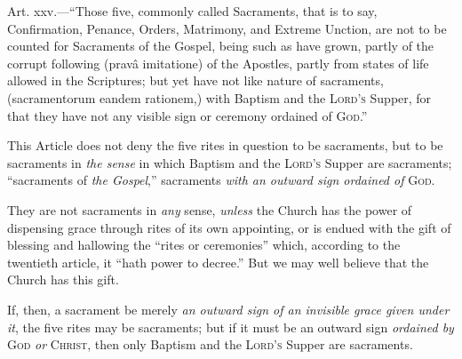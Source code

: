 
Art. xxv.—``Those five, commonly called Sacraments, that is
to say, Confirmation, Penance, Orders, Matrimony, and Extreme Unction,
are not to be counted for Sacraments of the Gospel, being such as have
grown, partly of the corrupt following (pravâ imitatione) of the
Apostles, partly from states of life allowed in the Scriptures; but
yet have not like nature of sacraments, (sacramentorum eandem rationem,)
with Baptism and the L\textsc{ord's} Supper, for that
they have not any visible sign or ceremony ordained of G\textsc{od}.''

This Article does not deny the five rites in question to be
sacraments, but to be sacraments in \emph{the sense} in which Baptism
and the L\textsc{ord's} Supper are sacraments;
``sacraments of \emph{the Gospel},'' sacraments \emph{with an
outward sign ordained of} G\textsc{od}.

They are not sacraments in \emph{any} sense, \emph{unless} the
Church has the power of dispensing grace through rites of its own
appointing, or is endued with the gift of blessing and hallowing the
``rites or ceremonies'' which, according to the twentieth
article, it ``hath power to decree.'' But we may well believe
that the Church has this gift.

If, then, a sacrament be merely \emph{an outward sign of an invisible
grace given under it}, the five rites may be sacraments; but if it
must be an outward sign \emph{ordained by} G\textsc{od} \emph{or}
C\textsc{hrist}, then only Baptism and the L\textsc{ord's}
Supper are sacraments.

